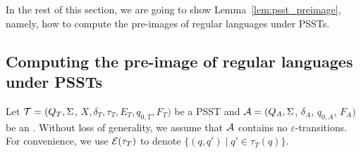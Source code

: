 %
%

In the rest of this section, we are going to show Lemma~\ref{lem:psst_preimage}, namely, how to compute the pre-images of regular languages under PSSTs.

\subsection{Computing the pre-image of regular languages under PSSTs}\label{sec-pre-image}


 
Let $\mathcal{T} = (Q_T, \Sigma$, $X, \delta_T, \tau_T, E_T,  q_{0, T}, F_T)$ be a PSST  and $\mathcal{A}
  = (Q_A, \Sigma$, $\delta_A$, $q_{0, A}$, $F_A)$ be an \FA{}. Without loss of generality, we assume that $\mathcal{A}$ contains no $\varepsilon$-transitions. For convenience, we use $\mathcal{E}(\tau_T)$ to denote $\{(q, q') \mid q' \in \tau_T(q)\}$.

